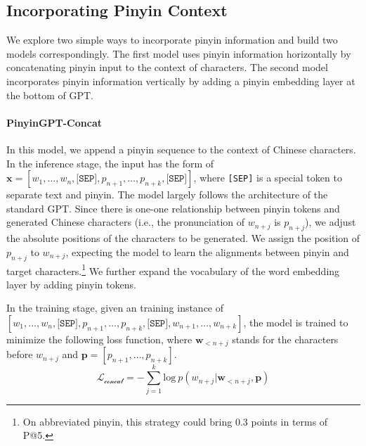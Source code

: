 \subsection{Incorporating Pinyin Context}
\label{sec:pinyin-context}
We explore two simple ways to incorporate pinyin information and build two models correspondingly.
The first model uses pinyin information horizontally by concatenating pinyin input to the context of characters.
The second model incorporates pinyin information vertically by adding a pinyin embedding layer at the bottom of GPT. 

\paragraph{PinyinGPT-Concat}
\label{sec:concatenation}
In this model, we append a pinyin sequence to the context of Chinese characters.
In the inference stage, the input has the form of $\mathbf{x} = [w_1,\dots,w_n,\texttt{[SEP]},p_{n+1},\dots,p_{n+k},\allowbreak\texttt{[SEP]} ]$, 
where \texttt{[SEP]} is a special token to separate text and pinyin.
The model largely follows the architecture of the standard GPT.
Since there is one-one relationship between pinyin tokens and generated Chinese characters (i.e., the pronunciation of $w_{n+j}$ is $p_{n+j}$), we adjust the absolute positions of the characters to be generated. We assign the position of $p_{n+j}$ to $w_{n+j}$, expecting the model to learn the alignments between pinyin and target characters.\footnote{On abbreviated pinyin, this strategy could bring 0.3 points in terms of P@5.}
We further expand the vocabulary of the word embedding layer by adding pinyin tokens. 


In the training stage, given an training instance of $[w_1,\dots,w_n,\texttt{[SEP]},p_{n+1},\dots,p_{n+k},\allowbreak\texttt{[SEP]} ,w_{n+1},\dots,w_{n+k}]$, the model is trained to minimize the following loss function, where $\mathbf{w}_{<n+j}$ stands for the characters before $w_{n+j}$ and $\mathbf{p} = [p_{n+1},\dots,p_{n+k}]$.
\begin{equation}
\mathcal{L_\text{concat}} = - \sum_{j=1}^k \text{log} \ p(w_{n+j}|\mathbf{w}_{<n+j}, \mathbf{p})
\end{equation}

